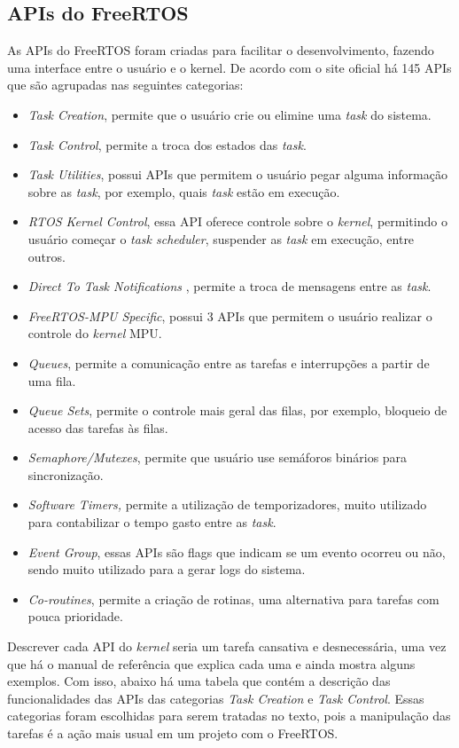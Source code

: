 \subsection{APIs do FreeRTOS}

As APIs do FreeRTOS foram criadas para facilitar o desenvolvimento, fazendo uma interface entre o usuário e o kernel. De acordo com o site oficial há 145 APIs que são agrupadas nas seguintes categorias:

\begin{itemize}
\item\textit{Task Creation}, permite que o usuário crie ou elimine uma \textit{task} do sistema.
\item\textit{Task Control}, permite a troca dos estados das \textit{task}.
\item\textit{Task Utilities}, possui APIs que permitem o usuário pegar alguma informação sobre as \textit{task}, por exemplo, quais \textit{task} estão em execução.
\item\textit{RTOS Kernel Control}, essa API oferece controle sobre o \textit{kernel}, permitindo o usuário começar o \textit{task scheduler},  suspender as \textit{task} em execução, entre outros.
\item\textit{Direct To Task Notifications} , permite a troca de mensagens entre as \textit{task}.
\item\textit{FreeRTOS-MPU Specific}, possui 3 APIs que permitem o usuário realizar o controle do \textit{kernel} MPU.
\item\textit{Queues}, permite a comunicação entre as tarefas e interrupções a partir de uma fila.
\item\textit{Queue Sets}, permite o controle mais geral das filas, por exemplo, bloqueio de acesso das tarefas às filas.
\item\textit{Semaphore/Mutexes}, permite que usuário use semáforos binários para sincronização.
\item\textit{Software Timers,} permite a utilização de temporizadores, muito utilizado para contabilizar o tempo gasto entre as \textit{task}.
\item\textit{Event Group}, essas APIs são flags que indicam se um evento ocorreu ou não, sendo muito utilizado para a gerar logs do sistema.
\item\textit{Co-routines}, permite a criação de rotinas, uma alternativa para tarefas com pouca prioridade.
\end{itemize}

Descrever cada API do \textit{kernel} seria um tarefa cansativa e desnecessária, uma vez que há o manual de referência que explica cada uma e ainda mostra alguns exemplos. Com isso, abaixo há uma tabela que contém a descrição das funcionalidades das APIs das categorias \textit{Task Creation} e \textit{Task Control}. Essas categorias foram escolhidas para serem tratadas no texto, pois a manipulação das tarefas é a ação mais usual em um projeto com o FreeRTOS.

